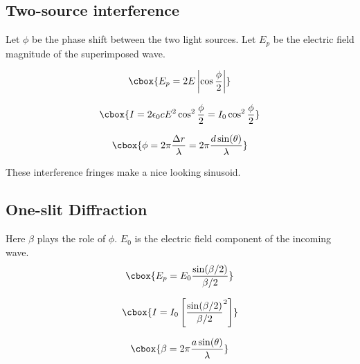 \documentclass{hw}
\numberwithin{equation}{section}
\begin{document}
\subsection{Two-source interference}
Let $\phi$ be the phase shift between the two light sources. Let $E_p$ be the
electric field magnitude of the superimposed wave.

\begin{equation}
  \cbox{E_p = 2E\left| \cos \frac{\phi}{2} \right|}
\end{equation}

\begin{equation}
  \cbox{%
    I = 2 \epsilon_0 c E^2 \cos^2 \frac{\phi}{2} = I_0 \cos^2 \frac{\phi}{2}
  }
\end{equation}

\begin{equation}
  \cbox{%
    \phi = 2 \pi \frac{\Delta r}{\lambda} = 2 \pi \frac{d \sin(\theta)}{\lambda}
  }
\end{equation}

These interference fringes make a nice looking sinusoid.

\subsection{One-slit Diffraction}
Here $\beta$ plays the role of $\phi$. $E_0$ is the electric field component of
the incoming wave.
\begin{equation}
  \cbox{E_p = E_0 \frac{\sin(\beta / 2)}{\beta / 2}}
\end{equation}

\begin{equation}
  \cbox{I = I_0 \left[ \frac{\sin(\beta / 2)}{\beta / 2}^2 \right]}
\end{equation}

\begin{equation}
  \cbox{\beta = 2 \pi \frac{a \sin(\theta)}{\lambda}}
\end{equation}

\end{document}
